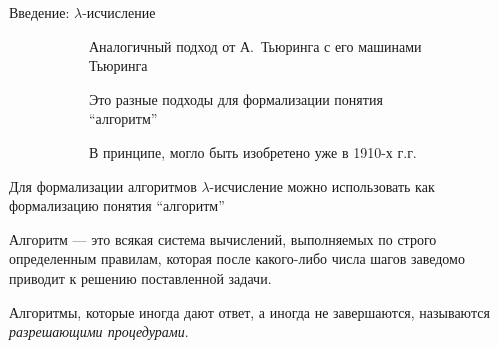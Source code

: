 \begin{frame}{Введение: $\lambda$-исчисление}
\begin{figure}
\begin{subfigure}[t]{0.45\textwidth}
Аналогичный подход от А.~Тьюринга с его машинами Тьюринга
\vspace{1em}

Это разные подходы для формализации понятия \enquote{алгоритм}
\vspace{1em}

В принципе, могло быть изобретено уже в 1910-х г.г.

    \end{subfigure}
  \end{figure}
\end{frame}

\begin{frame}{Для формализации алгоритмов}
$\lambda$-исчисление можно использовать как формализацию понятия \enquote{алгоритм}

\begin{definition}
Алгоритм --- это всякая система вычислений, выполняемых по строго определенным правилам, которая после какого-либо числа шагов заведомо приводит к решению поставленной задачи.
\end{definition}
\vspace{2em}

Алгоритмы, которые иногда дают ответ, а иногда не завершаются, называются \textit{разрешающими процедурами}.
\end{frame}

